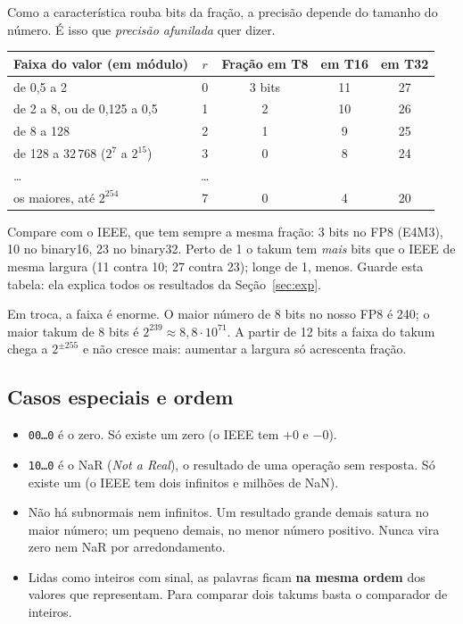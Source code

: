 \documentclass[11pt,a4paper]{article}
\newcommand{\code}[1]{\texttt{#1}}
\begin{document}
Como a característica rouba bits da fração, a precisão depende do tamanho do número. É isso que
\emph{precisão afunilada} quer dizer.

\begin{center}
\begin{tabular}{lcccc}
\toprule
Faixa do valor (em módulo) & $r$ & Fração em T8 & em T16 & em T32\\
\midrule
de 0,5 a 2 & 0 & 3 bits & 11 & 27\\
de 2 a 8, ou de 0,125 a 0,5 & 1 & 2 & 10 & 26\\
de 8 a 128 & 2 & 1 & 9 & 25\\
de 128 a $32\,768$ ($2^{7}$ a $2^{15}$) & 3 & 0 & 8 & 24\\
\ldots & \ldots & & & \\
os maiores, até $2^{254}$ & 7 & 0 & 4 & 20\\
\bottomrule
\end{tabular}
\end{center}

Compare com o IEEE, que tem sempre a mesma fração: 3 bits no FP8 (E4M3), 10 no binary16, 23 no binary32.
Perto de 1 o takum tem \emph{mais} bits que o IEEE de mesma largura (11 contra 10; 27 contra 23); longe
de 1, menos. Guarde esta tabela: ela explica todos os resultados da Seção~\ref{sec:exp}.

Em troca, a faixa é enorme. O maior número de 8 bits no nosso FP8 é 240; o maior takum de 8 bits é
$2^{239}\approx 8{,}8\cdot10^{71}$. A partir de 12 bits a faixa do takum chega a $2^{\pm255}$ e não cresce
mais: aumentar a largura só acrescenta fração.

\subsection{Casos especiais e ordem}

\begin{itemize}[nosep]
  \item \code{00\ldots0} é o zero. Só existe um zero (o IEEE tem $+0$ e $-0$).
  \item \code{10\ldots0} é o NaR (\emph{Not a Real}), o resultado de uma operação sem resposta. Só existe
        um (o IEEE tem dois infinitos e milhões de NaN).
  \item Não há subnormais nem infinitos. Um resultado grande demais satura no maior número; um pequeno
        demais, no menor número positivo. Nunca vira zero nem NaR por arredondamento.
  \item Lidas como inteiros com sinal, as palavras ficam \textbf{na mesma ordem} dos valores que
        representam. Para comparar dois takums basta o comparador de inteiros.
\end{itemize}
\end{document}
